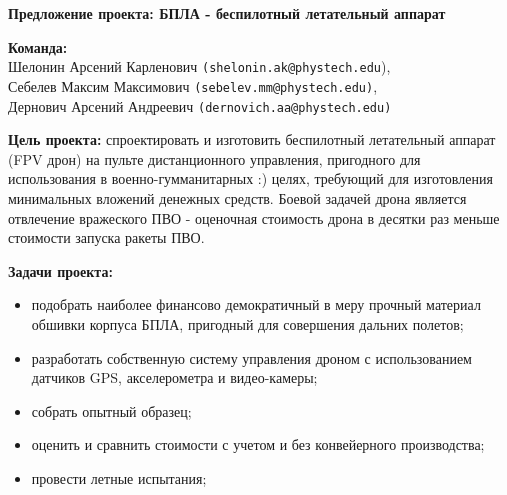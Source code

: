 \documentclass[a4paper,12pt]{article}
\begin{document}
	
	\begin{center}
		\Large\textbf{Предложение проекта: БПЛА - беспилотный летательный аппарат}
	\end{center}
	
	\vspace{0.5cm}
	
	\textbf{Команда:}\\
	Шелонин Арсений Карленович \texttt{(shelonin.ak@phystech.edu}),\\
	Себелев Максим Максимович \texttt{(sebelev.mm@phystech.edu)},\\
	Дернович Арсений Андреевич
	\texttt{(dernovich.aa@phystech.edu)} 
	
	\vspace{0.5cm}
	
	\textbf{Цель проекта:} спроектировать и изготовить беспилотный летательный аппарат (FPV дрон) на пульте дистанционного управления, пригодного для использования в военно-гумманитарных :) целях, требующий для изготовления минимальных вложений денежных средств. Боевой задачей дрона является отвлечение вражеского ПВО - оценочная стоимость дрона в десятки раз меньше стоимости запуска ракеты ПВО.
	
	\vspace{0.5cm}
	
	\textbf{Задачи проекта:}
	\begin{itemize}
		\item подобрать наиболее финансово демократичный в меру прочный материал обшивки корпуса БПЛА, пригодный для совершения дальних полетов;
		\item разработать собственную систему управления дроном с использованием датчиков GPS, акселерометра и видео-камеры;
		\item собрать опытный образец;
		\item оценить и сравнить стоимости с учетом и без конвейерного производства;
		\item провести летные испытания;
	\end{itemize}
	
	\vspace{0.5cm}
	
\end{document}
